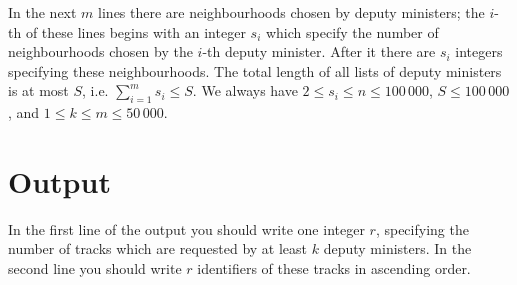 In the next $m$ lines there are neighbourhoods chosen by deputy ministers; the $i$-th of these lines begins with an integer $s_i$ which specify the number of neighbourhoods chosen by the $i$-th deputy minister. After it there are $s_i$ integers specifying these neighbourhoods. The total length of all lists of deputy ministers is at most $S$, i.e. $\sum_{i=1}^{m}s_i \leq S$.
%
We always have $2 \leq s_i \leq n \leq 100\,000$, $S \leq 100\,000$, and $1 \leq k \leq m \leq 50\,000$. 
%


\section*{Output}
In the first line of the output you should write one integer $r$, specifying the number of tracks which are requested by at least $k$ deputy ministers. In the second line you should write $r$ identifiers of these tracks in ascending order.

